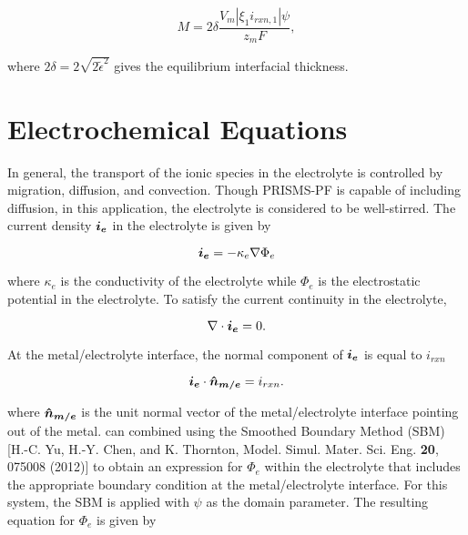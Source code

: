 \documentclass[11pt]{article}
\begin{document}
\begin{equation} \label{mobility}
M = 2\delta\frac{V_m|\xi_1 i_{rxn,1}|\psi}{z_mF},
\end{equation}

where $2\delta=2\sqrt{2\widetilde{\epsilon}^2}$ gives the equilibrium interfacial thickness.

\bigskip
\section{Electrochemical Equations}

In general, the transport of the ionic species in the electrolyte is controlled by migration, diffusion, and convection. Though PRISMS-PF is capable of including diffusion, in this application, the electrolyte is considered to be well-stirred. The current density $\vb*{i_e}$ in the electrolyte is given by

\begin{equation} \label{electrolyte_i_e}
\vb*{i_e} = -\kappa_e\nabla\Phi_e
\end{equation}

where $\kappa_e$ is the conductivity of the electrolyte while $\Phi_e$ is the electrostatic potential in the electrolyte. To satisfy the current continuity in the electrolyte,

\begin{equation} \label{curr_continuity}
\nabla \cdot \vb*{i_e} = 0.
\end{equation}

At the metal/electrolyte interface, the normal component of $\vb*{i_e}$ is equal to $i_{rxn}$

\begin{equation} \label{i_e_BC}
\vb*{i_e}\cdot\vb*{\hat n_{m/e}}=i_{rxn}.
\end{equation}

where $\vb*{\hat n_{m/e}}$ is the unit normal vector of the metal/electrolyte interface pointing out of the metal.  can combined using the Smoothed Boundary Method (SBM) [H.-C. Yu, H.-Y. Chen, and K. Thornton, Model. Simul. Mater. Sci. Eng. {\bf 20}, 075008
(2012)] to obtain an expression for $\Phi_e$ within the electrolyte that includes the appropriate boundary condition at the metal/electrolyte interface. For this system, the SBM is applied with $\psi$ as the domain parameter. The resulting equation for $\Phi_e$ is given by 
\end{document}
